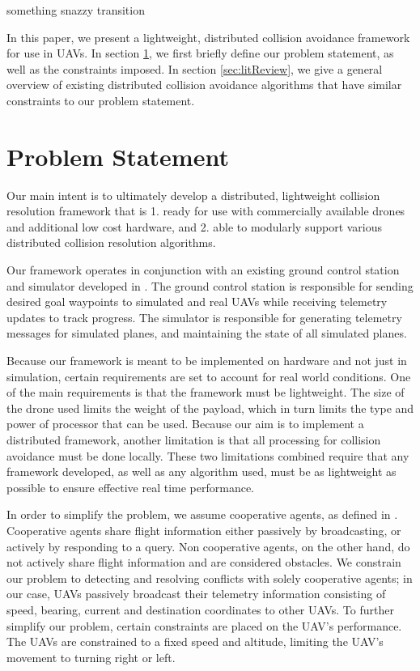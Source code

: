 \documentclass[conference]{IEEEtran}
\begin{document}
something snazzy transition

In this paper, we present a lightweight, distributed collision avoidance framework for use in UAVs. In section \ref{sec:problem}, we first briefly define our problem statement, as well as the constraints imposed. In section \ref{sec:litReview}, we give a general overview of existing distributed collision avoidance algorithms that have similar constraints to our problem statement. 

\section{Problem Statement}
\label{sec:problem}

Our main intent is to ultimately develop a distributed, lightweight collision resolution framework  that is 1. ready for use with commercially available drones  and additional low cost hardware, and 2. able to modularly support various distributed collision resolution algorithms. 

Our framework operates in conjunction with an existing ground control station and simulator developed in \cite{holt2012comparison}. The ground control station is responsible for sending desired goal waypoints to simulated and real UAVs while receiving telemetry updates to track progress. The simulator is responsible for generating telemetry messages for simulated planes, and maintaining the state of all simulated planes. 

Because our framework is meant to be implemented on hardware and not just in simulation, certain requirements are set to account for real world conditions. One of the main requirements is that the framework must be lightweight. The size of the drone used limits the weight of the payload, which in turn limits the type and power of processor that can be used. Because our aim is to implement a distributed framework, another limitation is that all processing for collision avoidance must be done locally. These two limitations combined require that any framework developed, as well as any algorithm used, must be as lightweight as possible to ensure effective real time performance.

In order to simplify the problem, we assume cooperative agents, as defined in \cite{roadmap2002roadmap}. Cooperative agents share flight information either passively by broadcasting, or actively by responding to a query. Non cooperative agents, on the other hand, do not actively share flight information and are considered obstacles. We constrain our problem to detecting and resolving conflicts with solely cooperative agents; in our case, UAVs passively broadcast their telemetry information consisting of speed, bearing, current and destination coordinates to other UAVs. To further simplify our problem, certain constraints are placed on the UAV’s performance.  The UAVs are constrained to a fixed speed and altitude, limiting the UAV’s movement to turning right or left. 
\end{document}
